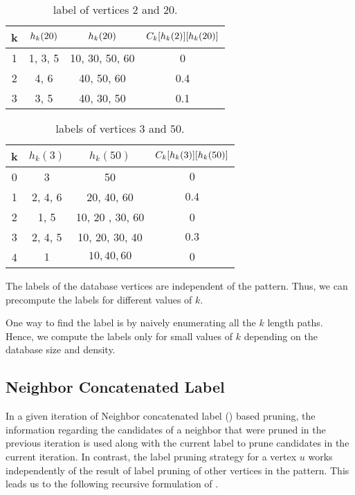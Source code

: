 \begin{table}[h]
    \centering
    \begin{tabular}{|c|c|c|c|}
        \hline
        k & $h_{k}(20)$ & $h_{k}(20)$ & $C_{k}[h_{k}(2)][h_{k}(20)]$\\
        \hline
        1 & 1, 3, 5 & 10, 30, 50, 60 & 0 \\
        2 & 4, 6 & 40, 50, 60 & 0.4 \\
        3 & 3, 5 & 40, 30, 50 & 0.1\\
        \hline
    \end{tabular}
    \caption{\khop label of vertices $2$ and $20$.}
    \label{tab:khop220}
\end{table}

\begin{table}[h]
    \centering
    \begin{tabular}{|c|c|c|c|}
        \hline
        k & $h_k(3)$ & $h_k(50)$ & $C_{k}[h_{k}(3)][h_{k}(50)]$ \\
        \hline
        0 & 3 & 50 & $0$\\
        1 & 2, 4, 6 & 20, 40, 60 & $0.4$ \\
        2 & 1, 5 & 10, 20 , 30, 60 & 0\\
        3 & 2, 4, 5 & 10, 20, 30, 40 & $0.3$ \\
        4 & $1$ & $10, 40, 60$ & $0$ \\
        \hline
    \end{tabular}
    \caption{\khop labels of vertices $3$ and $50$.}
    \label{tab:khop350}
\end{table}


\smallskip{} The \khop
labels of the database vertices are independent of the pattern. Thus, we
can precompute the \khop labels for different values of $k$.


One way to find the \khop label is by naively
enumerating all the $k$ length paths.
Hence, we compute the \khop labels only for small values of $k$ depending on the
database size and density. 





\subsection{Neighbor Concatenated Label} 
In a given iteration of Neighbor concatenated label (\ncl) based pruning,
the information regarding the candidates of a neighbor that were pruned 
in the previous iteration is used along with the current \khop label to
prune candidates in the current iteration. In contrast, the \khop label
pruning strategy for a vertex $u$ works independently of the result of
\khop label pruning of other vertices in the pattern. This leads us
to the following recursive formulation of \ncl.

